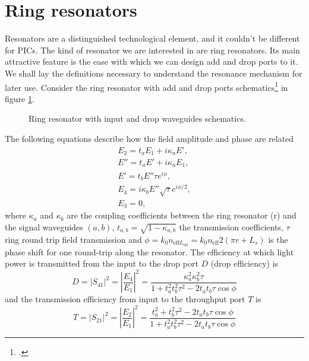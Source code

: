 \documentclass[12pt,twoside,english]{book}
\renewcommand{\~}{\perispomeni}%
\numberwithin{equation}{section}
\numberwithin{figure}{section}
\begin{document}
\section{Ring resonators}
Resonators are a distinguished technological element, and it couldn't be different for PICs. The kind of resonator we are interested in are ring resonators. Its main attractive feature is the ease with which we can design add and drop ports to it. We shall lay the definitions necessary to understand the resonance mechanism for later use.
Consider the ring resonator with add and drop ports schematics\footcite{Little:1997p39,Vorckel:2003p86} in figure \ref{fig:ring-resonator}.
\begin{figure}[H]
\center{}\caption{Ring resonator with input and drop waveguides schematics.\label{fig:ring-resonator}}
\end{figure}
The following equations describe how the field amplitude and phase are related
\begin{subequations}\begin{eqnarray}
E_{2}=t_{a}E_{1}+i\kappa_{a}E',\\
E''=t_{a}E'+i\kappa_{a}E_{1},\\
E'=t_{b}E''\tau e^{i\phi},\\
E_{4}=i\kappa_{b}E''\sqrt{\tau}e^{i\phi/2},\\
E_{3}=0,
\end{eqnarray}\end{subequations}
where $\kappa_a$ and $\kappa_b$ are the coupling coefficients between the ring resonator (r) and the signal waveguides $(a,b)$, $t_{a,b}=\sqrt{1-\kappa_{a,b}}$ the transmission coefficients, $\tau$ ring round trip field transmission and $\phi=k_0 n_{\text{eff}L_{\text{eff}}}=k_0 n_{\text{eff}}2\left(\pi r+L_s\right)$ is the phase shift for one round-trip along the resonator.
The efficiency at which light power is transmitted from the input to the drop port $D$ (drop efficiency) is 
\begin{equation}
D=\left|S_{41}\right|^{2}=\left|\frac{E_{4}}{E_{1}}\right|^{2}=\frac{\kappa_{a}^{2}\kappa_{b}^{2}\tau}{1+t_{a}^{2}t_{b}^{2}\tau^2-2t_{a}t_{b}\tau\cos\phi}
\label{eq:drop efficiency}
\end{equation}
and the transmission efficiency from input to the throughput port $T$ is
\begin{equation}
T=\left|S_{21}\right|^{2}=\left|\frac{E_{2}}{E_{1}}\right|^{2}=\frac{t_{a}^{2}+t_{b}^{2}\tau^{2}-2t_{a}t_{b}\tau\cos\phi}{1+t_{a}^{2}t_{b}^{2}\tau^2-2t_{a}t_{b}\tau\cos\phi}
\end{equation}
\end{document}
